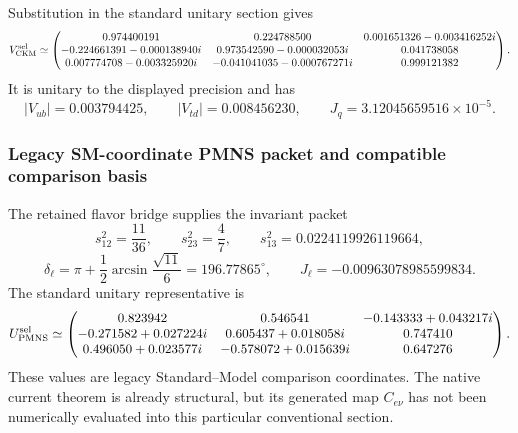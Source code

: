 \documentclass[11pt,a4paper]{article}
\begin{document}
\begin{proposition}
\label{p6:prop:selected-ckm-matrix}
Substitution in the standard unitary section gives
\begingroup
\scriptsize
\[
V_{\rm CKM}^{\rm sel}\simeq
\begin{pmatrix}
0.974400191 & 0.224788500 &
0.001651326-0.003416252i\\
-0.224661391-0.000138940i&
0.973542590-0.000032053i&
0.041738058\\
0.007774708-0.003325920i&
-0.041041035-0.000767271i&
0.999121382
\end{pmatrix}.
\]
\endgroup
It is unitary to the displayed precision and has
\[
|V_{ub}|=0.003794425,\qquad
|V_{td}|=0.008456230,\qquad
J_q=3.12045659516\times10^{-5}.
\]
\end{proposition}

\subsubsection{Legacy SM-coordinate PMNS packet and compatible comparison basis}

\begin{definition}
\label{p6:def:selected-pmns-packet}
The retained flavor bridge supplies the invariant packet
\[
s_{12}^2=\frac{11}{36},
\qquad
s_{23}^2=\frac47,
\qquad
s_{13}^2=0.0224119926119664,
\]
\[
\delta_\ell
=
\pi+\frac12\arcsin\frac{\sqrt{11}}6
=196.77865^\circ,
\qquad
J_\ell=-0.00963078985599834.
\]
The standard unitary representative is
\[
U_{\rm PMNS}^{\rm sel}\simeq
\begin{pmatrix}
0.823942&0.546541&-0.143333+0.043217i\\
-0.271582+0.027224i&0.605437+0.018058i&0.747410\\
0.496050+0.023577i&-0.578072+0.015639i&0.647276
\end{pmatrix}.
\]
These values are legacy Standard--Model comparison coordinates.  The native current theorem is already structural, but its generated map $C_{e\nu}$ has not been numerically evaluated into this particular conventional section.
\end{definition}
\end{document}
